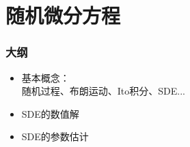 \documentclass{beamer}
\begin{document}
%
%
%
%
%
%
%

%
\section{随机微分方程}
 \begin{frame}

\frametitle{大纲}

\begin{itemize}
	\item 基本概念：\\
	随机过程、布朗运动、Ito积分、SDE...
	\item SDE的数值解
	\item SDE的参数估计
	
\end{itemize}



\end{frame}
\end{document}
